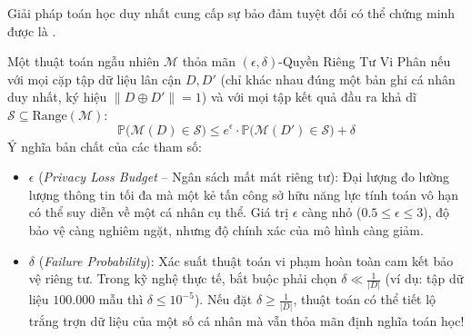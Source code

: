 Giải pháp toán học duy nhất cung cấp sự bảo đảm tuyệt đối có thể chứng minh được là .

\begin{definition}
Một thuật toán ngẫu nhiên $\mathcal{M}$ thỏa mãn $(\epsilon, \delta)$-Quyền Riêng Tư Vi Phân nếu với mọi cặp tập dữ liệu lân cận $D, D'$ (chỉ khác nhau đúng một bản ghi cá nhân duy nhất, ký hiệu $\|D \oplus D'\| = 1$) và với mọi tập kết quả đầu ra khả dĩ $\mathcal{S} \subseteq \text{Range}(\mathcal{M})$:
\begin{equation}
\mathbb{P}\big(\mathcal{M}(D) \in \mathcal{S}\big) \le e^\epsilon \cdot \mathbb{P}\big(\mathcal{M}(D') \in \mathcal{S}\big) + \delta
\label{eq:differential-privacy-def}
\end{equation}
Ý nghĩa bản chất của các tham số:
\begin{itemize}
  \item $\epsilon$ (\textit{Privacy Loss Budget} -- Ngân sách mất mát riêng tư): Đại lượng đo lường lượng thông tin tối đa mà một kẻ tấn công sở hữu năng lực tính toán vô hạn có thể suy diễn về một cá nhân cụ thể. Giá trị $\epsilon$ càng nhỏ ($0.5 \le \epsilon \le 3$), độ bảo vệ càng nghiêm ngặt, nhưng độ chính xác của mô hình càng giảm.
  \item $\delta$ (\textit{Failure Probability}): Xác suất thuật toán vi phạm hoàn toàn cam kết bảo vệ riêng tư. Trong kỹ nghệ thực tế, bắt buộc phải chọn $\delta \ll \frac{1}{|D|}$ (ví dụ: tập dữ liệu $100.000$ mẫu thì $\delta \le 10^{-5}$). Nếu đặt $\delta \ge \frac{1}{|D|}$, thuật toán có thể tiết lộ trắng trợn dữ liệu của một số cá nhân mà vẫn thỏa mãn định nghĩa toán học!
\end{itemize}
\end{definition}


